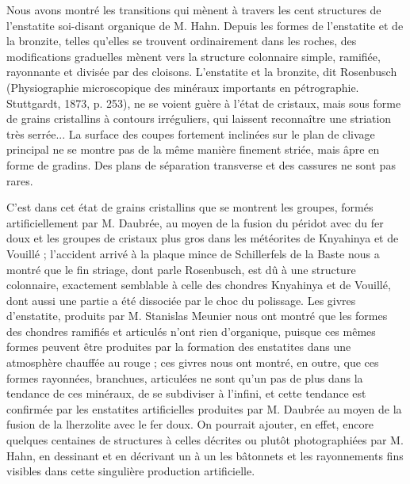 \documentclass[a4paper, 12pt, oneside, french]{book}
\begin{document}
Nous avons montré les transitions qui mènent à travers les \og cent structures \fg de l'enstatite soi-disant organique de M. Hahn. Depuis les formes de l'enstatite et de la bronzite, telles qu'elles se trouvent ordinairement dans les roches, des modifications graduelles mènent vers la structure colonnaire simple, ramifiée, rayonnante et divisée par des cloisons. \og L'enstatite et la bronzite, dit Rosenbusch (Physiographie microscopique des minéraux importants en pétrographie. Stuttgardt, 1873, p. 253), ne se voient guère à l'état de cristaux, mais sous forme de grains cristallins à contours irréguliers, qui laissent reconnaître une striation très serrée... La surface des coupes fortement inclinées sur le plan de clivage principal ne se montre pas de la même manière finement striée, mais âpre en forme de gradins. Des plans de séparation transverse et des cassures ne sont pas rares. \fg

C'est dans cet état de grains cristallins que se montrent les groupes, formés artificiellement par M. Daubrée, au moyen de la fusion du péridot avec du fer doux et les groupes de cristaux plus gros dans les météorites de Knyahinya et de Vouillé ; l'accident arrivé à la plaque mince de Schillerfels de la Baste nous a montré que le fin striage, dont parle Rosenbusch, est dû à une structure colonnaire, exactement semblable à celle des chondres Knyahinya et de Vouillé, dont aussi une partie a été dissociée par le choc du polissage. Les givres d'enstatite, produits par M. Stanislas Meunier nous ont montré que les formes des chondres ramifiés et articulés n'ont rien d'organique, puisque ces mêmes formes peuvent être produites par la formation des enstatites dans une atmosphère chauffée au rouge ; ces givres nous ont montré, en outre, que ces formes rayonnées, branchues, articulées ne sont qu'un pas de plus dans la tendance de ces minéraux, de se subdiviser à l'infini, et cette tendance est confirmée par les enstatites artificielles produites par M. Daubrée au moyen de la fusion de la lherzolite avec le fer doux. On pourrait ajouter, en effet, encore quelques centaines de structures à celles décrites ou plutôt photographiées par M. Hahn, en dessinant et en décrivant un à un les bâtonnets et les rayonnements fins visibles dans cette singulière production artificielle.
\end{document}
